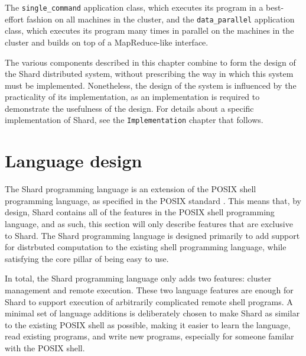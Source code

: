 \documentclass[twoside]{report}
\begin{document}
The \texttt{single\_command} application class, which executes its program in a best-effort fashion on all machines in the cluster, and the \texttt{data\_parallel} application class, which executes its program many times in parallel on the machines in the cluster and builds on top of a MapReduce-like \cite{dean2004mapreduce} interface.

The various components described in this chapter combine to form the design of the Shard distributed system, without prescribing the way in which this system must be implemented.
Nonetheless, the design of the system is influenced by the practicality of its implementation, as an implementation is required to demonstrate the usefulness of the design.
For details about a specific implementation of Shard, see the \texttt{Implementation} chapter that follows.

\section{Language design}


The Shard programming language is an extension of the POSIX shell programming language, as specified in the POSIX standard \cite{posix2017}.
This means that, by design, Shard contains all of the features in the POSIX shell programming language, and as such, this section will only describe features that are exclusive to Shard.
The Shard programming language is designed primarily to add support for distrbuted computation to the existing shell programming language, while satisfying the core pillar of being easy to use.

In total, the Shard programming language only adds two features: cluster management and remote execution.
These two language features are enough for Shard to support execution of arbitrarily complicated remote shell programs.
A minimal set of language additions is deliberately chosen to make Shard as similar to the existing POSIX shell as possible, making it easier to learn the language, read existing programs, and write new programs, especially for someone familar with the POSIX shell.
\end{document}
